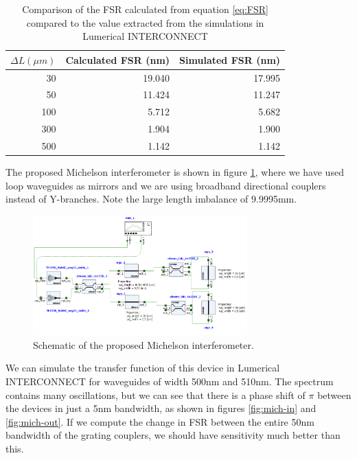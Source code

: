 \documentclass[journal]{IEEEtran}
\begin{document}
\begin{table}
\centering
\begin{tabular}{ r | r | r }
  \hline
  $\Delta L (\mu m)$ & Calculated FSR (nm) & Simulated FSR (nm) \\
  \hline
  30                 & 19.040              & 17.995 \\
  50                 & 11.424              & 11.247 \\
  100                & 5.712               & 5.682 \\
  300                & 1.904               & 1.900 \\
  500                & 1.142               & 1.142 \\
\end{tabular}
\caption{Comparison of the FSR calculated from equation \ref{eq:FSR} compared to the value extracted from the simulations in Lumerical INTERCONNECT}
\label{tab:MZI}
\end{table}

The proposed Michelson interferometer is shown in figure \ref{fig:mich-scheme}, where we have used loop waveguides as mirrors and we are using broadband directional couplers instead of Y-branches. Note the large length imbalance of 9.9995mm.

\begin{figure}[t!]
  \centering
  \includegraphics[width = 3.25in]{fig/Michaelson_schematic.png}
  \caption{Schematic of the proposed Michelson interferometer.}
  \label{fig:mich-scheme}
\end{figure}

We can simulate the transfer function of this device in Lumerical INTERCONNECT for waveguides of width 500nm and 510nm. The spectrum contains many oscillations, but we can see that there is a phase shift of $\pi$ between the devices in just a 5nm bandwidth, as shown in figures \ref{fig:mich-in} and \ref{fig:mich-out}. If we compute the change in FSR between the entire 50nm bandwidth of the grating couplers, we should have sensitivity much better than this.
\end{document}

